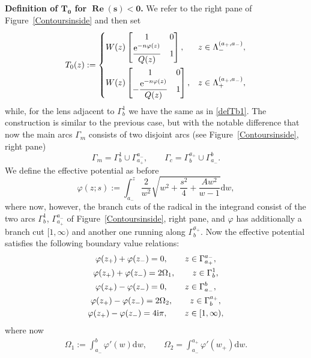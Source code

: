 \documentclass[10pt,a4paper]{amsart}
\numberwithin{equation}{section}
\theoremstyle{definition}
\def \ds{\displaystyle}
\def \d{{\mathrm d}}
\def\nn{\nonumber}
\def \Re{\operatorname{Re} }
\begin{document}
{\bf Definition of $\boldsymbol{T_0}$ for $\boldsymbol{\Re(s)<0}$.}
We refer to the right pane of Figure~\ref{Contoursinside} and then set
\begin{gather*}%
T_0(z):=
\begin{cases}
\ds W(z) \begin{bmatrix}
1 & 0 \\
\displaystyle \frac{ {\rm e}^{-n\varphi(z)}}{ Q(z)} & 1
\end{bmatrix},& z\in \Lambda_-^{(a_+,a_-)},
\vspace{1mm}\\
W(z) \begin{bmatrix}
1 & 0 \\
\displaystyle-\frac{ {\rm e}^{-n\varphi(z)}}{ Q(z)} & 1
\end{bmatrix}, & z\in \Lambda_+^{(a_+,a_-)},
\end{cases}
\end{gather*}
while, for the lens  adjacent to $\Gamma_b^1$ we have the same as in \eqref{defTb1}.
 The construction is similar to the previous case, but with the notable difference that now the main arcs $\Gamma_m$ consists of two disjoint arcs (see Figure~\ref{Contoursinside}, right pane)
\[
\Gamma_m = \Gamma_{b}^1 \cup \Gamma_{a_+}^{a_-}, \qquad
 \Gamma_c = \Gamma_b^{a_+} \cup \Gamma_{a_-}^b.
 \]
 We define the effective potential as before
 \[
 \varphi(z;s) := \int_{a_-}^z \frac 2 {w^2} \sqrt{w^2 + \frac {s^2}4 + \frac {Aw^2}{w-1}}\d w,
 \]
 where now, however, the branch cuts of the radical in the integrand consist of the two arcs $\Gamma_{b}^1 $, $ \Gamma_{a_+}^{a_-}$ of Figure~\ref{Contoursinside}, right pane, and $\varphi$ has additionally a branch cut $[1,\infty)$ and another one running along $\Gamma_b^{a_+}$.
 Now the effective potential satisfies the following boundary value relations:
 \begin{gather*}
\varphi(z_+)+\varphi(z_-) = 0, \qquad z\in \Gamma_{a_+}^{a_-},
\\
\varphi(z_+)+\varphi(z_-) = 2\Omega_1, \qquad z\in \Gamma_{b}^{1},
\nn
\\
\varphi(z_+)-\varphi(z_-) = 0, \qquad z\in \Gamma_{a_-}^{b},
\\
 \varphi(z_+)-\varphi(z_-) = 2\Omega_2, \qquad z\in \Gamma^{a_+}_{b},
\\
 \varphi(z_+)-\varphi(z_-) = 4{\rm i}\pi, \qquad z\in [1,\infty),
 \end{gather*}
 where now
 \begin{gather}
 \label{defOmega12bis}
 \Omega_1:= \int_{a_-}^b \varphi'(w)\d w,\qquad \Omega_2 = \int_{a_-}^{a_+} \varphi'(w_+)\d w.
 \end{gather}
\end{document}
